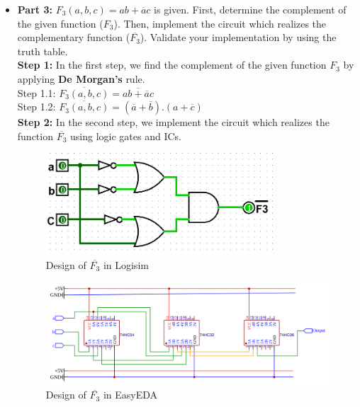 \documentclass[pdftex,12pt,a4paper]{article}
\begin{document}
\begin{itemize}
    \item \textbf{Part 3:} $F_3 (a, b, c) = ab + \overline{a}c$ is given. First, determine the complement of the given function ($F_3$). Then, implement the circuit which realizes the complementary function ($\overline{F_3}$). Validate your implementation by using the truth table.\\

    \textbf{Step 1:} In the first step, we find the complement of the given function $F_3$ by applying \textbf{De Morgan's} rule.\\
    
    Step 1.1: $\overline{F_3 (a, b, c)} = \overline{ab + \overline{a}c}$ \\
    
    Step 1.2: $\overline{F_3 (a, b, c)} = (\overline{a} + \overline{b}) . (a + \overline{c})$\\
    
    \textbf{Step 2:} In the second step, we implement the circuit which realizes the function $\overline{F_3}$ using logic gates and ICs.\\

    \begin{figure}[H]
    \centering
        \includegraphics[width=0.8\textwidth]{F3comp.png}	
        \caption{Design of \textbf{$\overline{F_3}$} in Logisim}
   \end{figure}
   	
	\begin{figure}[H]
    \centering
        \includegraphics[width=\textwidth]{EasyEDA_part_3.png}	
        \caption{Design of \textbf{$\overline{F_3}$} in EasyEDA}        
	\end{figure}   
   

\end{itemize}
\end{document}
